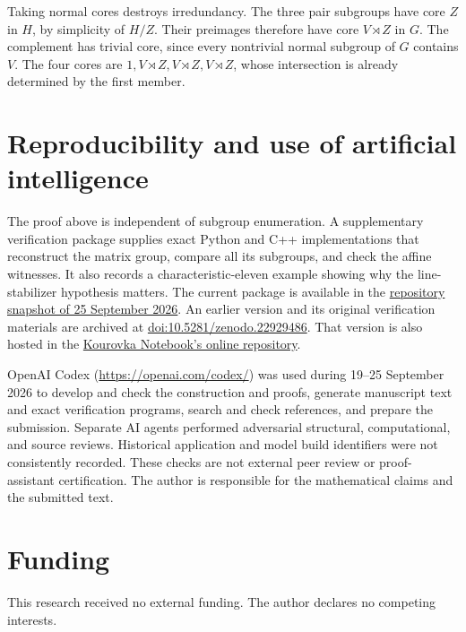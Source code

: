\IfFileExists{baustms.cls}{\bulletinformattrue\documentclass[plain]{baustms}}{\bulletinformatfalse\documentclass[11pt]{amsart}}
\theoremstyle{cupthm}
\begin{document}
Taking normal cores destroys irredundancy. The three pair subgroups
have core $Z$ in $H$, by simplicity of $H/Z$. Their preimages therefore
have core $V\rtimes Z$ in $G$. The complement has trivial core, since
every nontrivial normal subgroup of $G$ contains $V$.
The four cores are $1,V\rtimes Z,V\rtimes Z,V\rtimes Z$,
whose intersection is already determined by the first member.

\section*{Reproducibility and use of artificial intelligence}
The proof above is independent of subgroup enumeration. A supplementary
verification package supplies exact Python and C++ implementations that
reconstruct the matrix group, compare all its subgroups, and check the
affine witnesses. It also records a characteristic-eleven example showing
why the line-stabilizer hypothesis matters. The current package is available
in the \href{https://github.com/AlecKriebel/Math/tree/be0f06ee0c61739dcda5629e2c4223e7da7951d3/kourovka_16_45/journal_submission_2026_09_25/supplement}{repository snapshot of 25 September 2026}.
An earlier version and its original verification materials are archived at
\href{https://doi.org/10.5281/zenodo.22929486}{doi:10.5281/zenodo.22929486}.
That version is also hosted in the
\href{https://kourovkanotebookorg.wordpress.com/repository/}{Kourovka Notebook's online repository}.

OpenAI Codex (\url{https://openai.com/codex/}) was used during
19--25 September 2026 to develop and check the construction and proofs,
generate manuscript text and exact verification programs, search and check
references, and prepare the submission. Separate AI agents performed
adversarial structural, computational, and source reviews. Historical
application and model build identifiers were not consistently recorded.
These checks are not external peer review or proof-assistant certification.
The author is responsible for the mathematical claims and the submitted text.

\section*{Funding}
This research received no external funding.
The author declares no competing interests.
\end{document}
